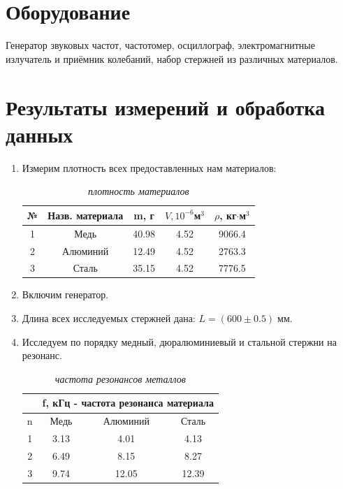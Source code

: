 \documentclass[a4paper, 10pt, twocolumn]{article}
\begin{document}
\section{Оборудование}
Генератор звуковых частот, частотомер, осциллограф,
электромагнитные излучатель и приёмник колебаний, набор стержней из различных материалов.

\section{Результаты измерений и обработка данных}
\begin{enumerate}
    \item Измерим плотность всех предоставленных нам материалов:
    \centering
    \begin{table}[h]
        \centering
        \caption{\textit{плотность материалов}}
        \label{tab:my_label}
        \begin{tabular}{|c|c|c|c|c|}
        \hline
        № & Назв. материала & m, г & $V, 10^{-6}$м$^{3}$ & $\rho$, кг$\cdot$м$^3$ \\ \hline
        1 & Медь               & 40.98 & 4.52 & 9066.4 \\ \hline
        2 & Алюминий           & 12.49  & 4.52 & 2763.3 \\ \hline
        3 & Сталь              & 35.15  & 4.52 & 7776.5 \\ \hline
        \end{tabular}
    \end{table}
    \item Включим генератор.
    \item Длина всех исследуемых стержней дана: $L = (600\pm0.5)\;\text{мм}$.
    \item Исследуем по порядку медный, дюралюминиевый и стальной стержни на
    резонанс.
    \begin{table}[h]
        \centering
        \caption{\textit{частота резонансов металлов}}
        \label{tab:my_label}
        \begin{tabular}{|c|| c|c|c|} \hline
        & \multicolumn{3}{c|}{f, кГц - частота резонанса материала} \\ \hline
        \hline
        n & Медь & Алюминий & Сталь \\ \hline
        1 & 3.13  & 4.01  & 4.13 \\ \hline
        2 & 6.49  & 8.15  & 8.27 \\ \hline
        3 & 9.74  & 12.05 & 12.39 \\ \hline

\end{tabular}
\end{table}
\end{enumerate}
\end{document}
